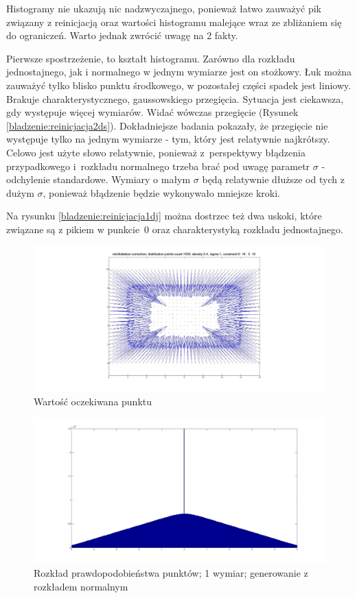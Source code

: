 \documentclass{mini}
\begin{document}
Histogramy nie ukazują nic nadzwyczajnego, ponieważ łatwo zauważyć pik związany z reinicjacją oraz wartości histogramu malejące wraz ze zbliżaniem się do ograniczeń. Warto jednak zwrócić uwagę na 2 fakty.

Pierwsze spostrzeżenie, to kształt histogramu. Zarówno dla rozkładu jednostajnego, jak i normalnego w jednym wymiarze jest on stożkowy. Łuk można zauważyć tylko blisko punktu środkowego, w pozostałej części spadek jest liniowy. Brakuje charakterystycznego, gaussowskiego przegięcia. Sytuacja jest ciekawsza, gdy występuje więcej wymiarów. Widać wówczas przegięcie (Rysunek \ref{bladzenie:reinicjacja2ds}). Dokładniejsze badania pokazały, że przegięcie nie występuje tylko na jednym wymiarze - tym, który jest relatywnie najkrótszy. Celowo jest użyte słowo relatywnie, ponieważ z~perspektywy błądzenia przypadkowego i~rozkładu normalnego trzeba brać pod uwagę parametr $\sigma$ - odchylenie standardowe. Wymiary o małym $\sigma$ będą relatywnie dłuższe od tych z dużym $\sigma$, ponieważ błądzenie będzie wykonywało mniejsze kroki.

Na rysunku \ref{bladzenie:reinicjacja1dj} można dostrzec też dwa uskoki, które związane są z pikiem w punkcie~$0$ oraz charakterystyką rozkładu jednostajnego.

\begin{figure}[H]
\centering
\includegraphics[width=\textwidth]{reinitialization2dprzesuniecie}
\caption{Wartość oczekiwana punktu}
\end{figure}

\begin{figure}[H]
\centering
\includegraphics[width=\textwidth]{ri_n_20M_1__5_5}
\caption{Rozkład prawdopodobieństwa punktów; 1 wymiar; generowanie z rozkładem normalnym}
\end{figure}
\end{document}
